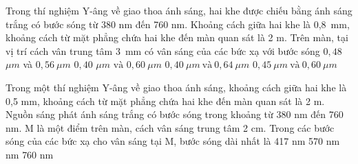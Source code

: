 \begin{vidu}%
 Trong thí nghiệm Y-âng về giao thoa ánh sáng, hai khe được chiếu bằng ánh sáng trắng có bước sóng từ 380 nm đến 760 nm. Khoảng cách giữa hai khe là 0,8\ mm, khoảng cách từ mặt phẳng chứa hai khe đến màn quan sát là 2 m. Trên màn, tại vị trí cách vân trung tâm 3\ mm có vân sáng của các bức xạ với bước sóng
\choice
{$0,48$ $\mu m$ và $0,56\ \mu m$}
{\True $0,40$ $\mu m$ $\text{và}$ $0,60\ \mu m$}
{$0,40\ \mu m\ \text{và}\ 0,64\ \mu m$}
{$0,45\ \mu m\ \text{và}\ 0,60\ \mu m$}

\end{vidu} 
\begin{vidu}%
 Trong một thí nghiệm Y-âng về giao thoa ánh sáng, khoảng cách giữa hai khe là 0,5 mm, khoảng cách từ mặt phẳng chứa hai khe đến màn quan sát là 2 m. Nguồn sáng phát ánh sáng trắng có bước sóng trong khoảng từ 380 nm đến 760 nm. M là một điểm trên màn, cách vân sáng trung tâm 2 cm. Trong các bước sóng của các bức xạ cho vân sáng tại M, bước sóng dài nhất là
\choice
{417 nm}
{570 nm}
{ nm}
{760 nm}
\end{vidu} 
